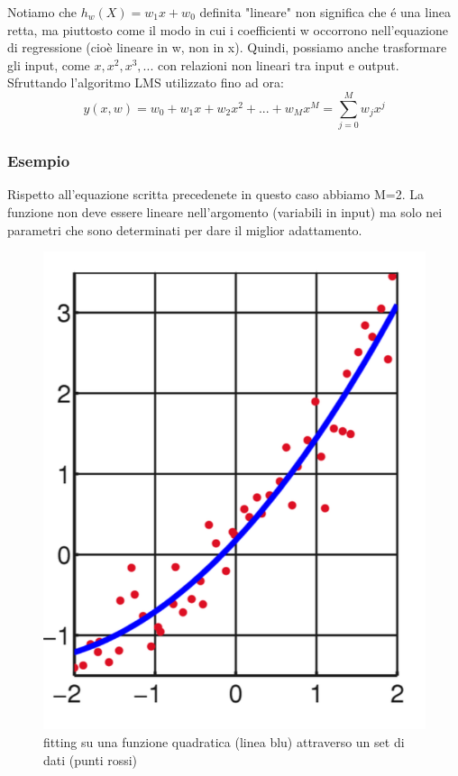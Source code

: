 \documentclass{article}
\begin{document}
Notiamo che $h_w(X)=w_1x+w_0$ definita "lineare" non significa che é una linea retta, ma piuttosto come il modo in cui i coefficienti w occorrono nell'equazione di regressione (cioè lineare in w, non in x). Quindi, possiamo anche trasformare gli input, come $x,x^2,x^3,...$ con relazioni non lineari tra input e output. Sfruttando l'algoritmo LMS utilizzato fino ad ora:
\begin{equation}
    y(x,w) = w_0+w_1x+w_2x^2+...+w_Mx^M=\sum_{j = 0}^M w_jx^j
\end{equation}

\subsubsection{Esempio}
Rispetto all'equazione scritta precedenete in questo caso abbiamo M=2. La funzione non deve essere lineare nell'argomento (variabili in input) ma solo nei parametri che sono determinati per dare il miglior adattamento. 
\begin{figure}[H]
    \centering
    \includegraphics[scale=0.4]{Images/quadraticfit.png}
    \caption{fitting su una funzione quadratica (linea blu) attraverso un set di dati (punti rossi)}
\end{figure}
\end{document}
